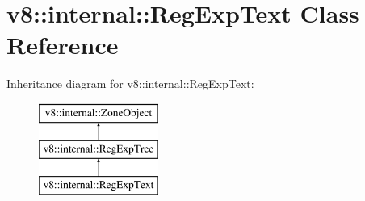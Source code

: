 \hypertarget{classv8_1_1internal_1_1RegExpText}{}\section{v8\+:\+:internal\+:\+:Reg\+Exp\+Text Class Reference}
\label{classv8_1_1internal_1_1RegExpText}
Inheritance diagram for v8\+:\+:internal\+:\+:Reg\+Exp\+Text\+:\begin{figure}[H]
\begin{center}
\leavevmode
\includegraphics[height=3.000000cm]{classv8_1_1internal_1_1RegExpText}
\end{center}
\end{figure}
